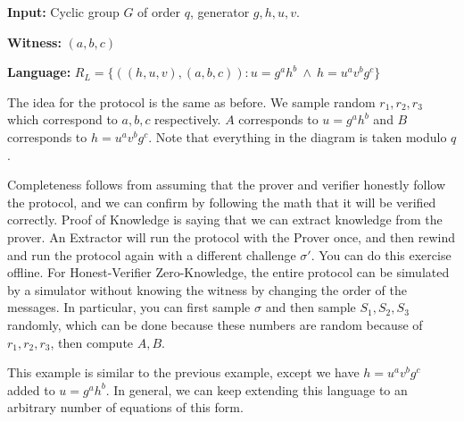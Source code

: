 \begin{example}

\textbf{Input:} Cyclic group $G$ of order $q$, generator $g, h, u, v$.

\textbf{Witness:} $(a, b, c)$

\textbf{Language:} $R_L = \{ ((h, u, v), (a, b, c)): u = g^a h^b\ \wedge\ h = u^a v^b g^c\}$

The idea for the protocol is the same as before. We sample random $r_1, r_2, r_3$ which correspond to $a, b, c$ respectively. $A$ corresponds to $u = g^ah^b$ and $B$ corresponds to $h = u^a v^b g^c$. Note that everything in the diagram is taken modulo $q$.


Completeness follows from assuming that the prover and verifier honestly follow the protocol, and we can confirm by following the math that it will be verified correctly. Proof of Knowledge is saying that we can extract knowledge from the prover. An Extractor will run the protocol with the Prover once, and then rewind and run the protocol again with a different challenge $\sigma '$. You can do this exercise offline. For Honest-Verifier Zero-Knowledge, the entire protocol can be simulated by a simulator without knowing the witness by changing the order of the messages. In particular, you can first sample $\sigma$ and then sample $S_1, S_2, S_3$ randomly, which can be done because these numbers are random because of $r_1, r_2, r_3$, then compute $A, B$.

This example is similar to the previous example, except we have $h = u^a v^b g^c$ added to $u = g^ah^b$. In general, we can keep extending this language to an arbitrary number of equations of this form. 

\end{example}

